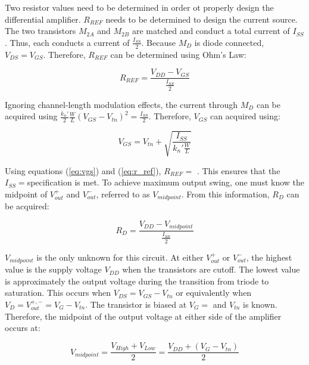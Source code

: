 Two resistor values need to be determined in order ot properly design the differential amplifier.
$R_{REF}$ needs to be determined to design the current source.
The two transistors $M_{2A}$ and $M_{2B}$ are matched and conduct a total current of $I_{SS}$.
Thus, each conducts a current of $\frac{I_{SS}}{2}$.
Because $M_{D}$ is diode connected, $V_{DS} = V_{GS}$.
Therefore, $R_{REF}$ can be determined using Ohm's Law:

\begin{equation}
	\label{eq:r_ref}
	R_{REF} = \frac{ V_{DD} - V_{GS} }{ \frac{I_{SS}}{2} }
\end{equation}

Ignoring channel-length modulation effects, the current through $M_{D}$ can be acquired using $\frac{k_{n}'}{2} \frac{W}{L} ( V_{GS} - V_{tn} )^{2} = \frac{ I_{SS} }{ 2 }$.
Therefore, $V_{GS}$ can acquired using:

\begin{equation}
	\label{eq:vgs}
	V_{GS} = V_{tn} + \sqrt{\frac{ I_{SS} }{ k_{n}' \frac{W}{L} }}
\end{equation}

Using equations (\ref{eq:vgs}) and (\ref{eq:r_ref}), $R_{REF} = $ \rref.
This ensures that the $I_{SS} = $\iss specification is met.
To achieve maximum output swing, one must know the midpoint of $V_{out}^{+}$ and $V_{out}^{-}$, referred to as $V_{midpoint}$.
From this information, $R_{D}$ can be acquired:

\begin{equation}
	\label{eq:r_d}
	R_{D} = \frac{ V_{DD} - V_{midpoint} }{ \frac{ I_{SS} }{ 2 } }
\end{equation}

$V_{midpoint}$ is the only unknown for this circuit.
At either $V_{out}^{+}$ or $V_{out}^{-}$, the highest value is the supply voltage $V_{DD}$ when the transistors are cutoff.
The lowest value is approximately the output voltage during the transition from triode to saturation.
This occurs when $V_{DS} = V_{GS} - V_{tn}$ or equivalently when $V_{D} = V_{out}^{+,-} = V_{G} - V_{tn}$.
The transistor is biased at $V_{G} = $ \vbias and $V_{tn}$ is known.
Therefore, the midpoint of the output voltage at either side of the amplifier occurs at:

\begin{equation}
	\label{eq:v_midpoint}
	V_{midpoint} = \frac{ V_{High} + V_{Low} }{ 2 } = \frac{ V_{DD} + ( V_{G} - V_{tn} ) }{ 2 }
\end{equation}

